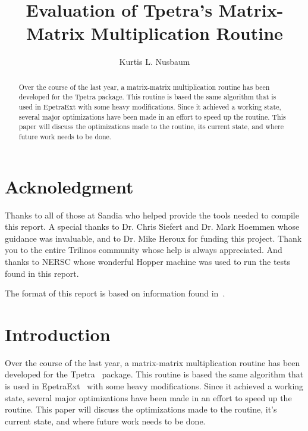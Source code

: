 \documentclass[pdf,12pt, strict]{SANDreport}
\title{Evaluation of Tpetra's Matrix-Matrix Multiplication Routine}
\author{Kurtis L. Nusbaum}
\date{}
\begin{document}
\maketitle

\begin{abstract}
Over the course of the last year, a matrix-matrix multiplication routine has been developed for the Tpetra package.
This routine is based the same algorithm that is used in EpetraExt with some heavy modifications. Since it 
achieved a working state, several major optimizations have been made in an effort to speed up the routine. This paper will
discuss the optimizations made to the routine, its current state, and where future work needs to be done.
\end{abstract}
\clearpage
\section*{Acknoledgment}
Thanks to all of those at Sandia who helped provide the tools needed to compile this report. A special thanks to Dr. Chris Siefert and Dr. Mark Hoemmen whose
guidance was invaluable, and to Dr. Mike Heroux for funding this project. Thank you to the entire Trilinos community whose help is always appreciated. And thanks
to NERSC whose wonderful Hopper machine was used to run the tests found in this report.

The format of this report is based on information found in~\cite{Sand98-0730}.
\cleardoublepage
\tableofcontents
\listoffigures
\listoftables
\clearpage

\SANDmain
\section{Introduction}
Over the course of the last year, a matrix-matrix multiplication routine has been developed for the 
Tpetra~\cite{TpetraHomePage}
package. This routine is based the same algorithm that is used in EpetraExt~\cite{EpetraExtHomePage} 
with some heavy modifications. Since it achieved a working state, several major optimizations have been made in an 
effort to speed up the routine. This paper will
discuss the optimizations made to the routine, it's current state, and where future work needs to be done.
\end{document}
